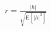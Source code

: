 \documentclass[border=2pt]{standalone}
\begin{document}
$r=\frac{|h|}{\sqrt{\mathrm{E}[|h|^2]}}$
\end{document}

